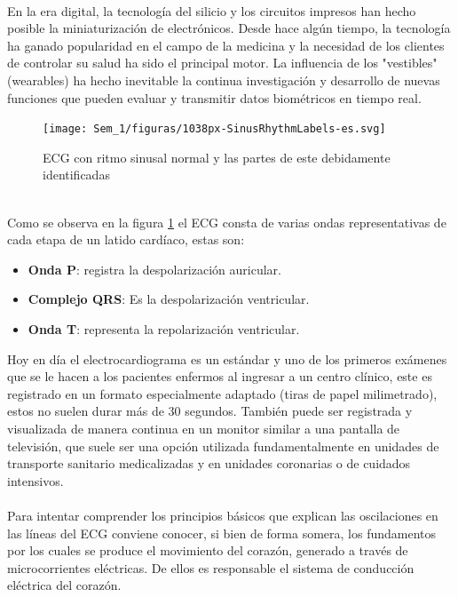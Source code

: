 \documentclass[12pt,letterpaper,oneside,openright]{book}
\begin{document}
    \\
    En la era digital, la tecnología del silicio y los circuitos impresos han hecho posible la miniaturización de electrónicos. Desde hace algún tiempo, la tecnología ha ganado popularidad en el campo de la medicina y la necesidad de los clientes de controlar su salud ha sido el principal motor. La influencia de los "vestibles" (wearables) ha hecho inevitable la continua investigación y desarrollo de nuevas funciones que pueden evaluar y transmitir datos biométricos en tiempo real. \\ 
    \begin{figure}[h]
    	\centering
    	\texttt{[image: Sem\_1/figuras/1038px-SinusRhythmLabels-es.svg]}
    	\caption{ECG con ritmo sinusal normal y las partes de este debidamente identificadas}
    	\label{fig:ECGSinusal}
    \end{figure}
    \\
    
    Como se observa en la figura \ref{fig:ECGSinusal} el ECG consta de varias ondas representativas de cada etapa de un latido cardíaco, estas son: \\	
	\begin{itemize}
		\item \textbf{Onda P}: registra la despolarización auricular.
		\item \textbf{Complejo QRS}: Es la despolarización ventricular.
		\item \textbf{Onda T}: representa la repolarización ventricular.
	\end{itemize}
	
	Hoy en día el electrocardiograma es un estándar y uno de los primeros exámenes que se le hacen a los pacientes enfermos al ingresar a un centro clínico, este es registrado en un formato especialmente adaptado (tiras de papel milimetrado), estos no suelen durar más de 30 segundos. También puede ser registrada y visualizada de manera continua en un monitor similar a una pantalla de televisión, que suele ser una opción utilizada fundamentalmente en unidades de transporte sanitario medicalizadas y en unidades coronarias o de cuidados intensivos. \\
	\\
	Para intentar comprender los principios básicos que explican las oscilaciones en las líneas del ECG conviene conocer, si bien de forma somera, los fundamentos por los cuales se produce el movimiento del corazón, generado a través de microcorrientes eléctricas. De ellos es responsable el sistema de conducción eléctrica del corazón.
	
\end{document}
